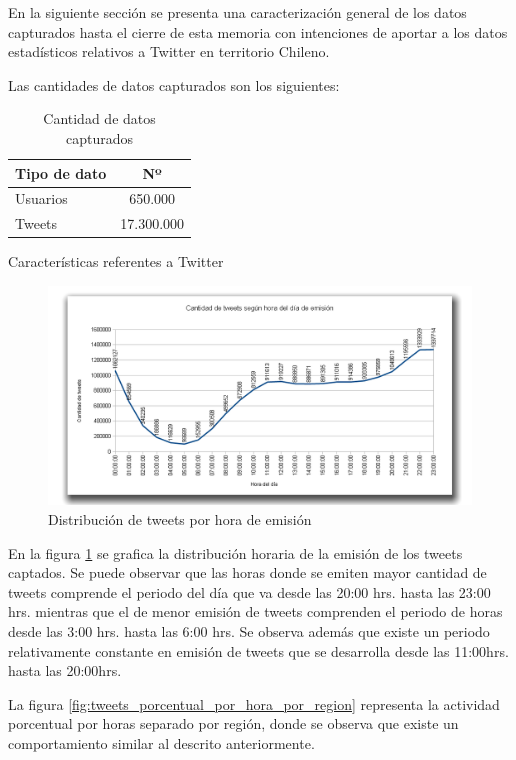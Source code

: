 En la siguiente sección se presenta una caracterización general de los datos capturados hasta el cierre de esta memoria con intenciones de aportar a los datos estadísticos relativos a Twitter en territorio Chileno.

Las cantidades de datos capturados son los siguientes:

\begin{table}[H]
	\centering
	\begin{tabular}{| l | c |}
		\hline
		Tipo de dato    & Nº\\ \hline
		Usuarios    & 650.000 \\ \hline
		Tweets		& 17.300.000 \\ \hline
	\end{tabular}
	\caption {Cantidad de datos capturados}
\end{table}

Características referentes a Twitter 

\begin{figure}[H]
	\centering
	\includegraphics[width=1\textwidth]{imgs/tweets_por_hora_del_dia.png}
	\caption{Distribución de tweets por hora de emisión}
	\label{fig:tweets_por_hora}
\end{figure}

En la figura \ref{fig:tweets_por_hora} se grafica la distribución horaria de la emisión de los tweets captados. Se puede observar que las horas donde se emiten mayor cantidad de tweets comprende el periodo del día que va desde las 20:00 hrs. hasta las 23:00 hrs. mientras que el de menor emisión de tweets comprenden el periodo de horas desde las 3:00 hrs. hasta las 6:00 hrs. Se observa además que existe un periodo relativamente constante en emisión de tweets que se desarrolla desde las 11:00hrs. hasta las 20:00hrs.

La figura \ref{fig:tweets_porcentual_por_hora_por_region} representa la actividad porcentual por horas separado por región, donde se observa que existe un comportamiento similar al descrito anteriormente.

